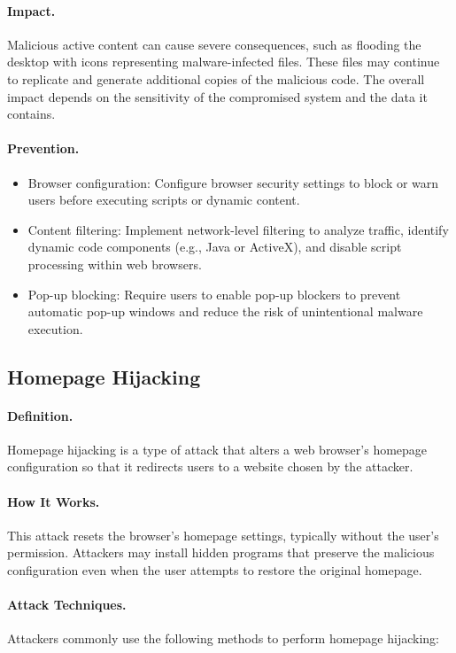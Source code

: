 \paragraph{Impact.}
Malicious active content can cause severe consequences, such as flooding the desktop with icons representing malware-infected files. These files may continue to replicate and generate additional copies of the malicious code. The overall impact depends on the sensitivity of the compromised system and the data it contains.

\paragraph{Prevention.}
\begin{itemize}
  \item Browser configuration: Configure browser security settings to block or warn users before executing scripts or dynamic content.
  \item Content filtering: Implement network-level filtering to analyze traffic, identify dynamic code components (e.g., Java or ActiveX), and disable script processing within web browsers.
  \item Pop-up blocking: Require users to enable pop-up blockers to prevent automatic pop-up windows and reduce the risk of unintentional malware execution.
\end{itemize}

\subsection{Homepage Hijacking}

\paragraph{Definition.}
Homepage hijacking is a type of attack that alters a web browser's homepage configuration so that it redirects users to a website chosen by the attacker.

\paragraph{How It Works.}
This attack resets the browser's homepage settings, typically without the user's permission. Attackers may install hidden programs that preserve the malicious configuration even when the user attempts to restore the original homepage.

\paragraph{Attack Techniques.}
Attackers commonly use the following methods to perform homepage hijacking:

